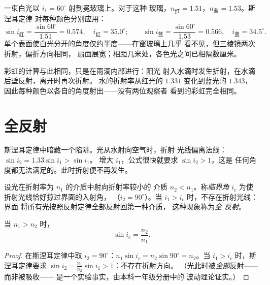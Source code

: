 \begin{example}\label{ex:g10:refraction:twocolors}
一束白光以 $i_1 = 60^\circ$ 射到冕玻璃上。对于这种
玻璃，$n_{\text{红}} = 1.51$，$n_{\text{蓝}} = 1.53$。斯涅耳定律
对每种颜色分别应用：
\[
\sin i_{\text{红}} = \frac{\sin 60^\circ}{1.51} = 0.574,
\quad i_{\text{红}} = 35.0^\circ ;
\qquad
\sin i_{\text{蓝}} = \frac{\sin 60^\circ}{1.53} = 0.566,
\quad i_{\text{蓝}} = 34.5^\circ .
\]
单个表面使白光分开的角度仅约半度——在窗玻璃上几乎
看不见，但三棱镜两次折射，偏折方向相同，
扇面展宽；相距几米处，各色光之间已相隔数厘米。
\end{example}

\begin{remark}\label{rem:g10:refraction:rainbow}
彩虹的计算与此相同，只是在雨滴内部进行：阳光
射入水滴时发生折射，在水滴后壁反射，离开时再次折射。
水的折射率从红光的 $1.331$ 变化到蓝光的 $1.343$，
因此每种颜色以各自的角度射出——没有两位观察者
看到的彩虹完全相同。
\end{remark}

\section{全反射}

斯涅耳定律中暗藏一个陷阱。光从水射向空气时，折射
光线偏离法线：$\sin i_2 = 1.33 \sin i_1 > \sin i_1$。
增大 $i_1$，公式很快就要求 $\sin i_2 > 1$，这是
任何角度都无法满足的。此时折射便不再发生。

\begin{definition}[临界角与全反射]\label{def:g10:refraction:critical}
设光在折射率为 $n_1$ 的介质中射向折射率较小的
介质 $n_2 < n_1$。称\emph{临界角}
$i_c$ 为使折射光线恰好掠过界面的入射角，
（$i_2 = 90^\circ$）。当 $i_1 > i_c$ 时，不存在折射光线：界面
将所有光按照反射定律全部反射回第一种介质，
这种现象称为\emph{全
反射}。
\end{definition}

\begin{proposition}[临界角公式]\label{prop:g10:refraction:criticalformula}
当 $n_1 > n_2$ 时，
\[
\sin i_c = \frac{n_2}{n_1} .
\]
\end{proposition}

\begin{proof}
在斯涅耳定律中取 $i_2 = 90^\circ$：$n_1 \sin i_c = n_2 \sin 90^\circ
= n_2$。当 $i_1 > i_c$ 时，斯涅耳定律要求
$\sin i_2 = \frac{n_1}{n_2}\sin i_1 > 1$：不存在折射方向。
（光此时被\emph{全部}反射——而非被吸收——
是一个实验事实，由本科一年级分册中的
波动理论证实。）
\end{proof}


